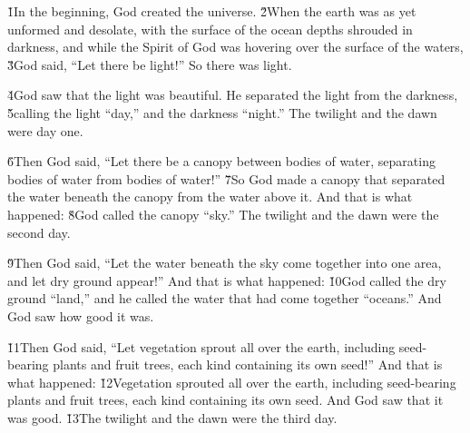 


\v{1}In the beginning, God created the universe. \v{2}When the earth was as yet unformed and desolate, with the surface of the ocean depths shrouded in darkness, and while the Spirit of God was hovering over the surface of the waters, \v{3}God said, ``Let there be light!'' So there was light.

\v{4}God saw that the light was beautiful. He separated the light from the darkness, \v{5}calling the light ``day,'' and the darkness ``night.'' The twilight and the dawn were day one.

\v{6}Then God said, ``Let there be a canopy between bodies of water, separating bodies of water from bodies of water!'' \v{7}So God made a canopy that separated the water beneath the canopy from the water above it. And that is what happened: \v{8}God called the canopy ``sky.'' The twilight and the dawn were the second day.

\v{9}Then God said, ``Let the water beneath the sky come together into one area, and let dry ground appear!'' And that is what happened: \v{10}God called the dry ground ``land,'' and he called the water that had come together ``oceans.'' And God saw how good it was.

\v{11}Then God said, ``Let vegetation sprout all over the earth, including seed-bearing plants and fruit trees, each kind containing its own seed!'' And that is what happened: \v{12}Vegetation sprouted all over the earth, including seed-bearing plants and fruit trees, each kind containing its own seed. And God saw that it was good. \v{13}The twilight and the dawn were the third day.

